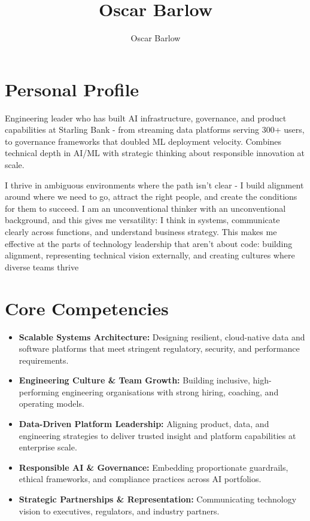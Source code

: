 \documentclass[a4paper]{scrartcl}
\author{Oscar Barlow}
\title{Oscar Barlow}
\date{}
\begin{document}
\maketitle

\section*{Personal Profile}
 { %
  \setlength{\parskip}{6pt plus 2pt minus 1pt}
  Engineering leader who has built AI infrastructure, governance, and product capabilities at Starling Bank - from streaming data platforms serving 300+ users, to governance frameworks that doubled ML deployment velocity. Combines technical depth in AI/ML with strategic thinking about responsible innovation at scale.

  I thrive in ambiguous environments where the path isn't clear - I build alignment around where we need to go, attract the right people, and create the conditions for them to succeed. I am an unconventional thinker with an unconventional background, and this gives me versatility: I think in systems, communicate clearly across functions, and understand business strategy. This makes me effective at the parts of technology leadership that aren't about code: building alignment, representing technical vision externally, and creating cultures where diverse teams thrive
 } %

\section*{Core Competencies}
\begin{itemize}
	\item \textbf{Scalable Systems Architecture:} Designing resilient, cloud-native data and software platforms that meet stringent regulatory, security, and performance requirements.
	\item \textbf{Engineering Culture \& Team Growth:} Building inclusive, high-performing engineering organisations with strong hiring, coaching, and operating models.
	\item \textbf{Data-Driven Platform Leadership:} Aligning product, data, and engineering strategies to deliver trusted insight and platform capabilities at enterprise scale.
	\item \textbf{Responsible AI \& Governance:} Embedding proportionate guardrails, ethical frameworks, and compliance practices across AI portfolios.
	\item \textbf{Strategic Partnerships \& Representation:} Communicating technology vision to executives, regulators, and industry partners.
\end{itemize}
\end{document}
